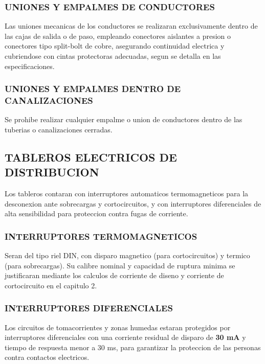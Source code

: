 \subsubsection{UNIONES Y EMPALMES DE CONDUCTORES}

Las uniones mecanicas de los conductores se realizaran exclusivamente dentro de las cajas de salida o de paso, empleando conectores aislantes a presion o conectores tipo split-bolt de cobre, asegurando continuidad electrica y cubriendose con cintas protectoras adecuadas, segun se detalla en las especificaciones.

\subsubsection{UNIONES Y EMPALMES DENTRO DE CANALIZACIONES}

Se prohibe realizar cualquier empalme o union de conductores dentro de las tuberias o canalizaciones cerradas.

\subsection{TABLEROS ELECTRICOS DE DISTRIBUCION}

Los tableros contaran con interruptores automaticos termomagneticos para la desconexion ante sobrecargas y cortocircuitos, y con interruptores diferenciales de alta sensibilidad para proteccion contra fugas de corriente.

\subsubsection{INTERRUPTORES TERMOMAGNETICOS}

Seran del tipo riel DIN, con disparo magnetico (para cortocircuitos) y termico (para sobrecargas). Su calibre nominal y capacidad de ruptura minima se justificaran mediante los calculos de corriente de diseno y corriente de cortocircuito en el capitulo 2.

\subsubsection{INTERRUPTORES DIFERENCIALES}

Los circuitos de tomacorrientes y zonas humedas estaran protegidos por interruptores diferenciales con una corriente residual de disparo de \textbf{30 mA} y tiempo de respuesta menor a 30 ms, para garantizar la proteccion de las personas contra contactos electricos.

